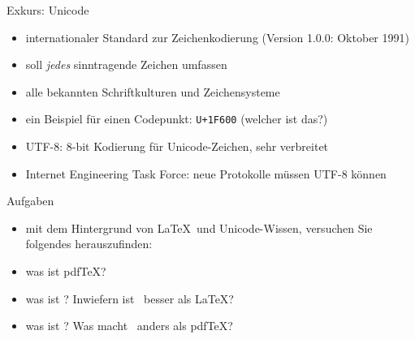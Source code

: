 \begin{frame}{Exkurs: Unicode}

\begin{itemize}
\itemsep1pt\parskip0pt
\item
  internationaler Standard zur Zeichenkodierung (Version 1.0.0: Oktober
  1991)
\item
  soll \emph{jedes} sinntragende Zeichen umfassen
\item
  alle bekannten Schriftkulturen und Zeichensysteme
\item
  ein Beispiel für einen Codepunkt: \texttt{U+1F600} (welcher ist das?)
\item
  UTF-8: 8-bit Kodierung für Unicode-Zeichen, sehr verbreitet
\item
  Internet Engineering Task Force: neue Protokolle müssen UTF-8 können
\end{itemize}

\end{frame}

\begin{frame}{Aufgaben}

\begin{itemize}
\itemsep1pt\parskip0pt
\item
  mit dem Hintergrund von \LaTeX \ und Unicode-Wissen, versuchen Sie
  folgendes herauszufinden:
\item
  was ist pdfTeX?
\item
  was ist \XeTeX? Inwiefern ist \XeTeX \ besser als \LaTeX?
\item
  was ist \LuaTeX? Was macht \LuaTeX \ anders als pdfTeX?
\end{itemize}

\end{frame}
